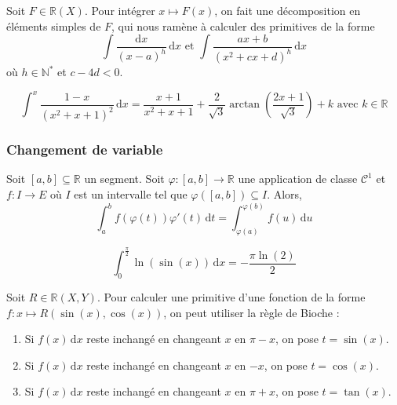 
  \begin{proposition}
    Soit $F \in \mathbb{R}(X)$. Pour intégrer $x \mapsto F(x)$, on fait une décomposition en éléments simples de $F$, qui nous ramène à calculer des primitives de la forme
    \[ \int \frac{\mathrm{d}x}{(x-a)^h} \, \mathrm{d}x \text{ et } \int \frac{ax+b}{(x^2+cx+d)^h} \, \mathrm{d}x \]
    où $h \in \mathbb{N}^*$ et $c-4d < 0$.
  \end{proposition}

  \begin{example}
    \[ \int^x \frac{1-x}{(x^2+x+1)^2} \, \mathrm{d}x = \frac{x+1}{x^2+x+1} + \frac{2}{\sqrt{3}} \arctan \left( \frac{2x+1}{\sqrt{3}} \right) + k \text{ avec } k \in \mathbb{R} \]
  \end{example}

  \subsubsection{Changement de variable}


  \begin{theorem}
    Soit $[a,b] \subseteq \mathbb{R}$ un segment. Soit $\varphi : [a,b] \rightarrow \mathbb{R}$ une application de classe $\mathcal{C}^1$ et $f : I \rightarrow E$ où $I$ est un intervalle tel que $\varphi([a,b]) \subseteq I$. Alors,
    \[ \int_a^b f(\varphi(t)) \varphi'(t) \, \mathrm{d}t = \int_{\varphi(a)}^{\varphi(b)} f(u) \, \mathrm{d}u \]
  \end{theorem}


  \begin{example}
    \[ \int_0^{\frac{\pi}{2}} \ln(\sin(x)) \, \mathrm{d}x = -\frac{\pi \ln(2)}{2} \]
  \end{example}


  \begin{proposition}
    Soit $R \in \mathbb{R}(X, Y)$. Pour calculer une primitive d'une fonction de la forme $f : x \mapsto R(\sin(x), \cos(x))$, on peut utiliser la règle de Bioche :
    \begin{enumerate}[label=(\roman*)]
      \item Si $f(x) \, \mathrm{d}x$ reste inchangé en changeant $x$ en $\pi - x$, on pose $t = \sin(x)$.
      \item Si $f(x) \, \mathrm{d}x$ reste inchangé en changeant $x$ en $- x$, on pose $t = \cos(x)$.
      \item Si $f(x) \, \mathrm{d}x$ reste inchangé en changeant $x$ en $\pi + x$, on pose $t = \tan(x)$.
    \end{enumerate}
  \end{proposition}

